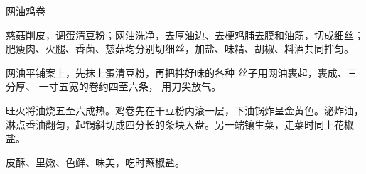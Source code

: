 \begin{recipe}{网油鸡卷}

\ingredients



\preparation

\step 慈菇削皮，调蛋清豆粉；网油洗净，去厚油边、去梗鸡脯去膜和油筋，切成细丝；
肥瘦肉、火腿、香菌、慈菇均分别切细丝，加盐、味精、胡椒、料酒共同拌匀。

网油平铺案上，先抹上蛋清豆粉，再把拌好味的各种 丝子用网油裹起，裹成、三分厚、
一寸五宽的卷约四至六条， 用刀尖放气。

\step 旺火将油烧五至六成热。鸡卷先在干豆粉内滚一层，下油锅炸呈金黄色。泌炸油，
淋点香油翻匀，起锅斜切成四分长的条块入盘。另一端镶生菜，走菜时同上花椒盐。

\features

皮酥、里嫩、色鲜、味美，吃时蘸椒盐。

\end{recipe}

